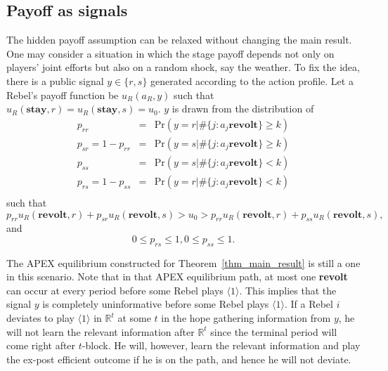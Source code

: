 \documentclass[12pt,letter]{article}
\newcommand{\Omicron}{\mathbb{R}}
\theoremstyle{definition}
\theoremstyle{remark}
\theoremstyle{claim}
\begin{document}
\subsection{Payoff as signals}
The hidden payoff assumption can be relaxed without changing the main result. One may consider a situation in which the stage payoff depends not only on players' joint efforts but also on a random shock, say the weather. To fix the idea, there is a public signal $y\in \{r,s\}$ generated according to the action profile. Let a Rebel's payoff function be $u_{R}(a_{R},y)$ such that $u_{R}(\textbf{stay},r)=u_{R}(\textbf{stay},s)=u_0$. $y$ is drawn from the distribution of 
\begin{eqnarray*}
p_{rr} &=& \mathrm {Pr}(y=r|\#\{j:a_j\textbf{revolt}\}\geq k) \\
p_{sr}=1-p_{rr} &=& \mathrm {Pr}(y=s|\#\{j:a_j\textbf{revolt}\}\geq k) \\
p_{ss} &=& \mathrm {Pr}(y=s|\#\{j:a_j\textbf{revolt}\}< k) \\
p_{rs}=1-p_{ss} &=& \mathrm {Pr}(y=r|\#\{j:a_j\textbf{revolt}\}< k) \\
\end{eqnarray*}
such that
\begin{equation*}
p_{rr}u_{R}(\textbf{revolt}, r)+p_{sr}u_{R}(\textbf{revolt}, s)>u_0>p_{rr}u_{R}(\textbf{revolt}, r)+p_{ss}u_{R}(\textbf{revolt}, s),
\end{equation*}
and
\begin{equation*}
0\leq p_{rs}\leq 1,0\leq p_{ss}\leq 1.
\end{equation*}

The APEX equilibrium constructed for Theorem~\ref{thm_main_result} is still a one in this scenario. Note that in that APEX equilibrium path, at most one \textbf{revolt} can occur at every period before some Rebel plays $\langle 1 \rangle$. This implies that the signal $y$ is completely uninformative before some Rebel plays $\langle 1 \rangle$. If a Rebel $i$ deviates to play $\langle 1 \rangle$ in $\Omicron^t$ at some $t$ in the hope gathering information from $y$, he will not learn the relevant information after $\Omicron^t$ since the terminal period will come right after $t$-block. He will, however, learn the relevant information and play the ex-post efficient outcome if he is on the path, and hence he will not deviate.

\end{document}
